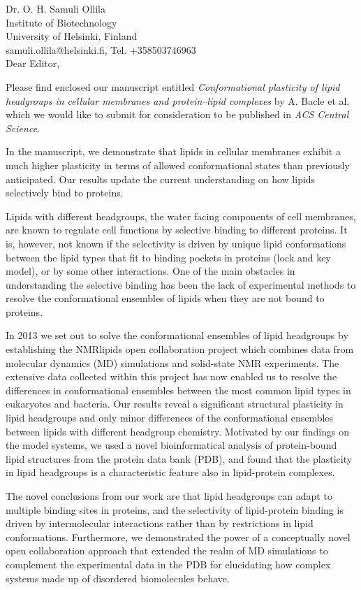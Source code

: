 \documentclass[11pt]{letter}
\begin{document}
\reversemarginpar
\pagestyle{empty}
\noindent Dr. O. H. Samuli Ollila \\
\noindent Institute of Biotechnology \\
\noindent University of Helsinki, Finland \\
\noindent samuli.ollila@helsinki.fi, Tel. +358503746963 \\


Dear Editor,

Please find enclosed our manuscript entitled {\it Conformational plasticity of lipid headgroups in cellular membranes and protein--lipid complexes}
by A. Bacle et al. which we would like to submit for consideration to be published in \textit{ACS Central Science}.

In the manuscript, we demonstrate that lipids in cellular membranes exhibit a much higher plasticity in terms of allowed conformational states than previously anticipated.
Our results update the current understanding on how lipids selectively bind to proteins.

Lipids with different headgroups, the water facing components of cell membranes, are known to regulate cell functions
by selective binding to different proteins. It is, however, not known if the selectivity is driven by unique
lipid conformations between the lipid types that fit to binding pockets in proteins (lock and key model), or by some other interactions.
One of the main obstacles in understanding the selective binding has been the lack of
experimental methods to resolve the conformational ensembles of lipids when they are not bound to proteins.

In 2013 we set out to solve the conformational ensembles of lipid headgroups by establishing the NMRlipids open collaboration project
which combines data from molecular dynamics (MD) simulations and solid-state NMR experiments.
The extensive data collected within this project has now enabled us to resolve the differences in conformational ensembles between the most common lipid types in eukaryotes and bacteria. 
Our results reveal a significant structural plasticity in lipid headgroups and only minor differences of the conformational ensembles
between lipids with different headgroup chemistry.
Motivated by our findings on the model systems, we used a novel bioinformatical analysis of protein-bound lipid structures from the protein data bank (PDB), and found that the plasticity in lipid headgroups is a characteristic feature also in lipid-protein complexes.

The novel conclusions from our work are that lipid headgroups can adapt to multiple binding sites in proteins,
and the selectivity of lipid-protein binding is driven by intermolecular interactions rather than by restrictions in lipid conformations.
Furthermore, we demonstrated the power of a conceptually novel open collaboration approach that extended the realm of MD simulations to complement the experimental data in the PDB for elucidating how complex systems made up of disordered biomolecules behave.
\end{document}
